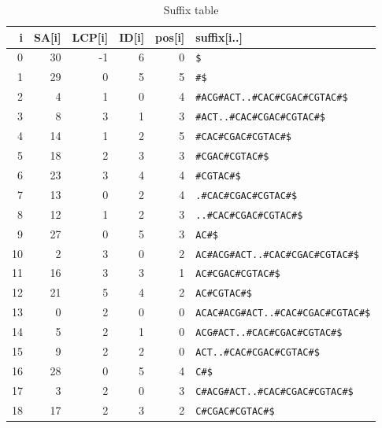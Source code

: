 \begin{table*}
    \caption{Suffix table}
    \label{tab:suffix}
    \begin{tabular}{rrrrrl}
        \toprule
        i & SA[i] & LCP[i] & ID[i] & pos[i] & suffix[i..]\\
        \midrule
         0  & 30 & -1 & 6 & 0 & \texttt{\$}                                     \\
         1  & 29 &  0 & 5 & 5 & \texttt{\#\$}                                   \\
         2  &  4 &  1 & 0 & 4 & \texttt{\#ACG\#ACT..\#CAC\#CGAC\#CGTAC\#\$}     \\
         3  &  8 &  3 & 1 & 3 & \texttt{\#ACT..\#CAC\#CGAC\#CGTAC\#\$}          \\
         4  & 14 &  1 & 2 & 5 & \texttt{\#CAC\#CGAC\#CGTAC\#\$}                 \\
         5  & 18 &  2 & 3 & 3 & \texttt{\#CGAC\#CGTAC\#\$}                      \\
         6  & 23 &  3 & 4 & 4 & \texttt{\#CGTAC\#\$}                            \\
         7  & 13 &  0 & 2 & 4 & \texttt{.\#CAC\#CGAC\#CGTAC\#\$}                \\
         8  & 12 &  1 & 2 & 3 & \texttt{..\#CAC\#CGAC\#CGTAC\#\$}               \\
         9  & 27 &  0 & 5 & 3 & \texttt{AC\#\$}                                 \\
        10  &  2 &  3 & 0 & 2 & \texttt{AC\#ACG\#ACT..\#CAC\#CGAC\#CGTAC\#\$}   \\
        11  & 16 &  3 & 3 & 1 & \texttt{AC\#CGAC\#CGTAC\#\$}                    \\
        12  & 21 &  5 & 4 & 2 & \texttt{AC\#CGTAC\#\$}                          \\
        13  &  0 &  2 & 0 & 0 & \texttt{ACAC\#ACG\#ACT..\#CAC\#CGAC\#CGTAC\#\$} \\
        14  &  5 &  2 & 1 & 0 & \texttt{ACG\#ACT..\#CAC\#CGAC\#CGTAC\#\$}       \\
        15  &  9 &  2 & 2 & 0 & \texttt{ACT..\#CAC\#CGAC\#CGTAC\#\$}            \\
        16  & 28 &  0 & 5 & 4 & \texttt{C\#\$}                                  \\
        17  &  3 &  2 & 0 & 3 & \texttt{C\#ACG\#ACT..\#CAC\#CGAC\#CGTAC\#\$}    \\
        18  & 17 &  2 & 3 & 2 & \texttt{C\#CGAC\#CGTAC\#\$}                     \\

\end{tabular}
\end{table*}
